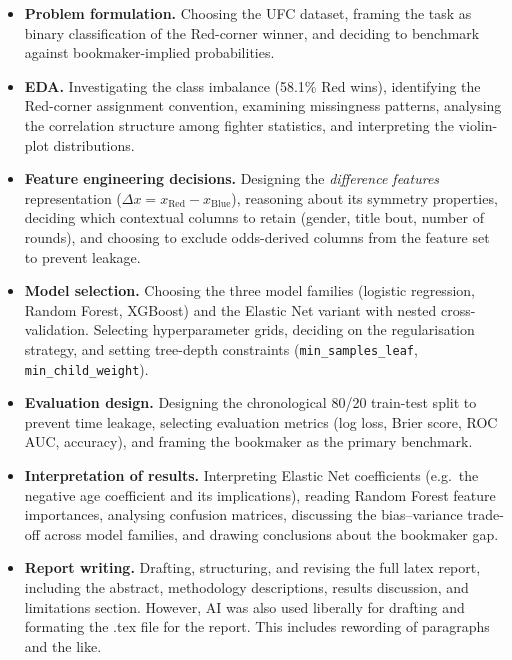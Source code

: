 \documentclass{article}
\begin{document}
\begin{itemize}
  \item \textbf{Problem formulation.}
    Choosing the UFC dataset, framing the task as binary classification of the
    Red-corner winner, and deciding to benchmark against bookmaker-implied
    probabilities.

  \item \textbf{EDA.}
    Investigating the class imbalance (58.1\% Red wins), identifying the
    Red-corner assignment convention, examining missingness patterns,
    analysing the correlation structure among fighter statistics,
    and interpreting the violin-plot distributions.

  \item \textbf{Feature engineering decisions.}
    Designing the \emph{difference features} representation
    ($\Delta x = x_{\text{Red}} - x_{\text{Blue}}$), reasoning about its
    symmetry properties, deciding which contextual columns to retain
    (gender, title bout, number of rounds), and choosing to exclude
    odds-derived columns from the feature set to prevent leakage.

  \item \textbf{Model selection.}
    Choosing the three model families (logistic regression, Random Forest,
    XGBoost) and the Elastic Net variant with nested cross-validation.
    Selecting hyperparameter grids, deciding on the regularisation strategy,
    and setting tree-depth constraints (\texttt{min\_samples\_leaf},
    \texttt{min\_child\_weight}).

  \item \textbf{Evaluation design.}
    Designing the chronological 80/20 train-test split to prevent time
    leakage, selecting evaluation metrics (log loss, Brier score, ROC AUC,
    accuracy), and framing the bookmaker as the primary benchmark.

  \item \textbf{Interpretation of results.}
    Interpreting Elastic Net coefficients (e.g.\ the negative age coefficient
    and its implications), reading Random Forest feature importances,
    analysing confusion matrices, discussing the bias--variance trade-off
    across model families, and drawing conclusions about the bookmaker gap.

  \item \textbf{Report writing.}
    Drafting, structuring, and revising the full latex report, including
    the abstract, methodology descriptions, results discussion, and
    limitations section. However, AI was also used liberally for drafting 
    and formating the .tex file for the report. This includes rewording of
    paragraphs and the like.

\end{itemize}
\end{document}
